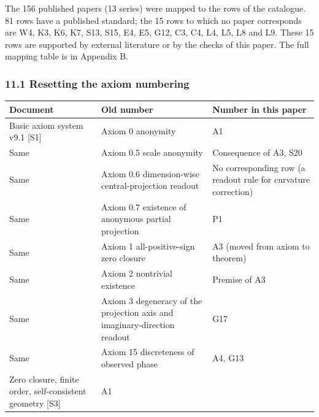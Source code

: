 \documentclass[
  a4paper,
]{article}
\newcounter{none} %
\begin{document}
The 156 published papers (13 series) were mapped to the rows of the
catalogue. 81 rows have a published standard; the 15 rows to which no
paper corresponds are W4, K3, K6, K7, S13, S15, E4, E5, G12, C3, C4, L4,
L5, L8 and L9. These 15 rows are supported by external literature or by
the checks of this paper. The full mapping table is in Appendix B.

\subsubsection{11.1 Resetting the axiom
numbering}\label{resetting-the-axiom-numbering}

{\def\LTcaptype{none} %
\begin{longtable}[]{@{}
  >{\raggedright\arraybackslash}p{}
  >{\raggedright\arraybackslash}p{}
  >{\raggedright\arraybackslash}p{}@{}}
\toprule\noalign{}
\begin{minipage}[b]{\linewidth}\raggedright
Document
\end{minipage} & \begin{minipage}[b]{\linewidth}\raggedright
Old number
\end{minipage} & \begin{minipage}[b]{\linewidth}\raggedright
Number in this paper
\end{minipage} \\
\midrule\noalign{}
\endhead
\bottomrule\noalign{}
\endlastfoot
Basic axiom system v9.1 {[}S1{]} & Axiom 0 anonymity & A1 \\
Same & Axiom 0.5 scale anonymity & Consequence of A3, S20 \\
Same & Axiom 0.6 dimension-wise central-projection readout & No
corresponding row (a readout rule for curvature correction) \\
Same & Axiom 0.7 existence of anonymous partial projection & P1 \\
Same & Axiom 1 all-positive-sign zero closure & A3 (moved from axiom to
theorem) \\
Same & Axiom 2 nontrivial existence & Premise of A3 \\
Same & Axiom 3 degeneracy of the projection axis and imaginary-direction
readout & G17 \\
Same & Axiom 15 discreteness of observed phase & A4, G13 \\
Zero closure, finite order, self-consistent geometry {[}S3{]} & A1

\end{longtable}}
\end{document}

